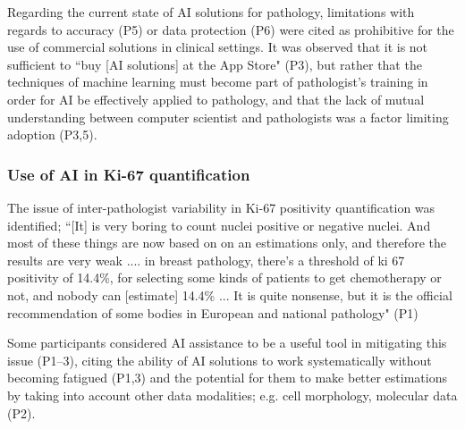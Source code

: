 Regarding the current state of AI solutions for pathology, limitations with regards to accuracy (P5) or data protection (P6) were cited as prohibitive for the use of commercial solutions in clinical settings. It was observed that it is not sufficient to ``buy [AI solutions] at the App Store" (P3), but rather that the techniques of machine learning must become part of pathologist's training in order for AI be effectively applied to pathology, and that the lack of mutual understanding between computer scientist and pathologists was a factor limiting adoption (P3,5).



\subsubsection{Use of AI in Ki-67 quantification}

The issue of inter-pathologist variability in Ki-67 positivity quantification was identified; ``[It] is very boring to count nuclei positive or negative nuclei. And most of these things are now based on on an estimations only, and therefore the results are very weak .... in breast pathology, there's a threshold of ki 67 positivity of 14.4\%, for selecting some kinds of patients to get chemotherapy or not, and nobody can [estimate] 14.4\% ... It is quite nonsense, but it is the official recommendation of some bodies in European and national pathology" (P1)

Some participants considered AI assistance to be a useful tool in mitigating this issue (P1--3), citing the ability of AI solutions to work systematically without becoming fatigued (P1,3) and the potential for them to make better estimations by taking into account other data modalities; e.g. cell morphology, molecular data (P2). 


